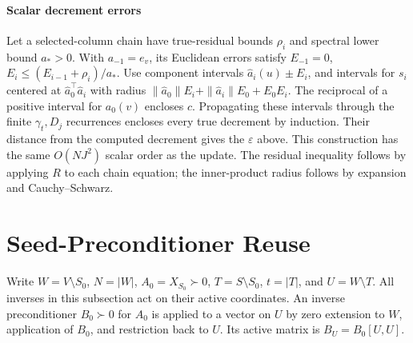 \paragraph{Scalar decrement errors}
Let a selected-column chain have true-residual bounds $\rho_i$ and
spectral lower bound $a_*>0$. With $a_{-1}=e_v$, its Euclidean
errors satisfy $E_{-1}=0$, $E_i\leq(E_{i-1}+\rho_i)/a_*$.
Use component intervals $\widehat a_i(u)\pm E_i$,
and intervals for $s_i$ centered at $\widehat a_0^\top\widehat a_i$
with radius
$\|\widehat a_0\|E_i+\|\widehat a_i\|E_0+E_0E_i$.
The reciprocal of a positive interval for $a_0(v)$ encloses $c$.
Propagating these intervals through the finite $\gamma_t,D_j$
recurrences encloses every true decrement by induction. Their
distance from the computed decrement gives the $\varepsilon$
above. This construction has the same $O(NJ^2)$ scalar order as
the update. The residual inequality follows by applying $R$ to
each chain equation; the inner-product radius follows by expansion
and Cauchy--Schwarz. 



\section{Seed-Preconditioner Reuse}\label{app:preconditioning}
Write $W=V\setminus S_0$, $N=|W|$, $A_0=X_{S_0}\succ0$,
$T=S\setminus S_0$, $t=|T|$, and $U=W\setminus T$.
All inverses in this subsection act on their active coordinates.
An inverse preconditioner $B_0\succ0$ for $A_0$ is applied to a
vector on $U$ by zero extension to $W$, application of $B_0$, and
restriction back to $U$. Its active matrix is $B_U=B_0[U,U]$.


